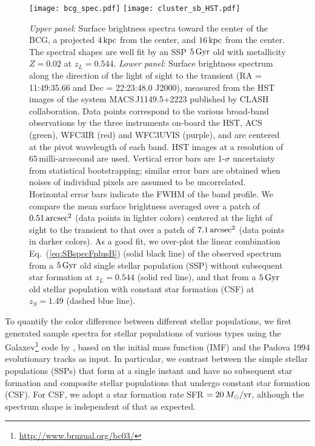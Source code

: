 \documentclass{aastex6}
\newcommand{\refeq}[1]{Eq.~(\ref{eq:#1})}
\begin{document}
\begin{figure}[t]
  \begin{center}
    \texttt{[image: bcg\_spec.pdf]}
    \texttt{[image: cluster\_sb\_HST.pdf]}
    \caption{\label{fig:cluster_sb_HST} {\it Upper panel}: Surface brightness spectra toward the center of the BCG, a projected $4\,{\rm kpc}$ from the center, and $16\,{\rm kpc}$ from the center. The spectral shapes are well fit by an SSP $5\,{\rm Gyr}$ old with metallicity $Z=0.02$ at $z_L=0.544$. {\it Lower panel}: Surface brightness spectrum along the direction of the light of sight to the transient (RA = 11:49:35.66 and Dec = 22:23:48.0 J2000), measured from the HST images of the system MACS\,J1149.5+2223 published by CLASH collaboration. Data points correspond to the various broad-band observations by the three instruments on-board the HST, ACS (green), WFC3IR (red) and WFC3UVIS (purple), and are centered at the pivot wavelength of each band. HST images at a resolution of $65\,$milli-arcsecond are used. Vertical error bars are 1-$\sigma$ uncertainty from statistical bootstrapping; similar error bars are obtained when noises of individual pixels are assumed to be uncorrelated. Horizontal error bars indicate the FWHM of the band profile. We compare the mean surface brightness averaged over a patch of $0.51\,{\rm arcsec}^2$ (data points in lighter colors) centered at the light of sight to the transient to that over a patch of $7.1\,{\rm arcsec}^2$ (data points in darker colors). As a good fit, we over-plot the linear combination \refeq{SBspecFplusB} (solid black line) of the observed spectrum from a $5\,{\rm Gyr}$ old single stellar population (SSP) without subsequent star formation at $z_L=0.544$ (solid red line), and that from a $5\,{\rm Gyr}$ old stellar population with constant star formation (CSF) at $z_S=1.49$ (dashed blue line).}
  \end{center}
\end{figure}


To quantify the color difference between different stellar populations, we first generated sample spectra for stellar populations of various types using the {\sc Galaxev}\footnote{\url{http://www.bruzual.org/bc03/}} code by \cite{2003MNRAS.344.1000B}, based on the \cite{2003PASP..115..763C} initial mass function (IMF) and the Padova 1994 \citep{1993A&AS..100..647B,1994A&AS..104..365F,1994A&AS..105...39F,1994A&AS..105...29F} evolutionary tracks as input. In particular, we contrast between the simple stellar populations (SSPs) that form at a single instant and have no subsequent star formation and composite stellar populations that undergo constant star formation (CSF). For CSF, we adopt a star formation rate SFR $=20\,M_\odot/{\rm yr}$, although the spectrum shape is independent of that as expected. 
\end{document}
